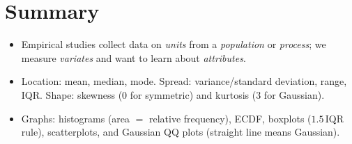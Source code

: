 \section*{Summary}
\begin{itemize}
  \item Empirical studies collect data on \emph{units} from a \emph{population} or
        \emph{process}; we measure \emph{variates} and want to learn about
        \emph{attributes}.
  \item Location: mean, median, mode. Spread: variance/standard deviation, range, IQR.
        Shape: skewness ($0$ for symmetric) and kurtosis ($3$ for Gaussian).
  \item Graphs: histograms (area $=$ relative frequency), ECDF, boxplots
        ($1.5\,\mathrm{IQR}$ rule), scatterplots, and Gaussian QQ plots (straight line
        means Gaussian).
\end{itemize}
